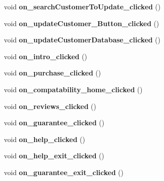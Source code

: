 \begin{DoxyCompactItemize}
\mbox{\label{class_main_window_aaa84473b8e95d3daecf19c98d2d93fdf}} 
void {\bfseries on\+\_\+search\+Customer\+To\+Update\+\_\+clicked} ()
\item 
\mbox{\label{class_main_window_ab6a0ec26c4c5077bf9c3bd604030cb98}} 
void {\bfseries on\+\_\+update\+Customer\+\_\+\+Button\+\_\+clicked} ()
\item 
\mbox{\label{class_main_window_a278add9518a4d8728056e5658341f694}} 
void {\bfseries on\+\_\+update\+Customer\+Database\+\_\+clicked} ()
\item 
\mbox{\label{class_main_window_a8279de9cb0d0a050e3e2e01cc3ff3c22}} 
void {\bfseries on\+\_\+intro\+\_\+clicked} ()
\item 
\mbox{\label{class_main_window_a43fac9cd5cabb59c84c2267f5da5e8e3}} 
void {\bfseries on\+\_\+purchase\+\_\+clicked} ()
\item 
\mbox{\label{class_main_window_ad68ce9e7ba575a4979df4f74bad3efc2}} 
void {\bfseries on\+\_\+compatability\+\_\+home\+\_\+clicked} ()
\item 
\mbox{\label{class_main_window_a65558d7d3f49458f039ed56b863b6f9f}} 
void {\bfseries on\+\_\+reviews\+\_\+clicked} ()
\item 
\mbox{\label{class_main_window_a68ce9e0c8f9a154d822ad631a4400607}} 
void {\bfseries on\+\_\+guarantee\+\_\+clicked} ()
\item 
\mbox{\label{class_main_window_afaa483412b8fb7fd0635698cea07b624}} 
void {\bfseries on\+\_\+help\+\_\+clicked} ()
\item 
\mbox{\label{class_main_window_acff4fd21883f39eaa0cadd61d4331d2e}} 
void {\bfseries on\+\_\+help\+\_\+exit\+\_\+clicked} ()
\item 
\mbox{\label{class_main_window_a95444c9c2e0fde460271c6cb0b8126fa}} 
void {\bfseries on\+\_\+guarantee\+\_\+exit\+\_\+clicked} ()
\item 

\end{DoxyCompactItemize}
